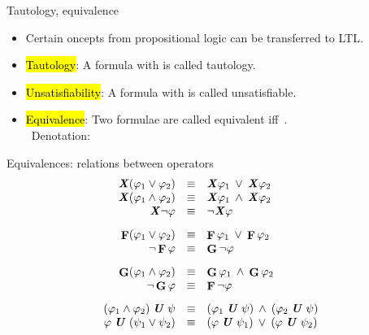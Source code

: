 \begin{frame}{Tautology, equivalence}
\begin{itemize}
\itemsep1em
\item Certain oncepts from propositional logic
   can be transferred to LTL.

\item \hl{Tautology}: A formula \m{\phi} with 
   is called tautology.

\item \hl{Unsatisfiability}: A formula \m{\phi} with \m{\sema{\phi}=\emptyset}
   is called unsatisfiable.

\item \hl{Equivalence}: Two formulae  are called equivalent
    iff\ .\\
    \ \phantom{Equivalence:}Denotation: 
\end{itemize}
\end{frame}


\begin{frame}{Equivalences: relations between operators}
$$\begin{array}{rcl}
\hl{\X} (\phi_1 \vee \phi_2) & \equiv & \hl{\X} \phi_1 \: \vee \: \hl{\X} \phi_2   \\
\hl{\X} (\phi_1 \wedge \phi_2) & \equiv & \hl{\X} \phi_1 \: \wedge \: \hl{\X} \phi_2   \\
\hl{\X} \neg \phi & \equiv & \neg \hl{\X} \phi \\[0.3cm]
\F (\phi_1 \vee \phi_2) & \equiv & \F \phi_1 \: \vee \: \F \phi_2   \\
\neg \F \phi& \equiv & \G \neg \phi \\[0.3cm]
\G (\phi_1 \wedge \phi_2)&\equiv & \G \phi_1 \: \wedge \: \G \phi_2 \\
\neg \G \phi& \equiv & \F \neg \phi \\[0.3cm]
(\phi_1 \wedge \phi_2) \hl{\U} \psi & \equiv & (\phi_1 \hl{\U} \psi) \: \wedge \: (\phi_2 \hl{\U} \psi)\\
\phi \hl{\U} (\psi_1 \vee \psi_2) & \equiv & (\phi \hl{\U} \psi_1) \: \vee \: (\phi \hl{\U} \psi_2)
\end{array}$$
\end{frame}


